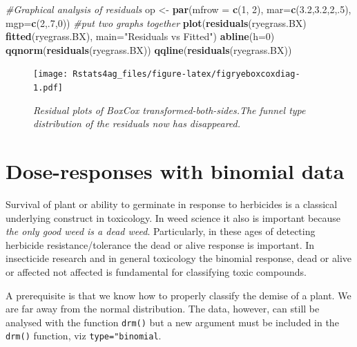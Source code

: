 \documentclass[letterpaper,]{book}
\newenvironment{Shaded}{\begin{snugshade}}{\end{snugshade}}
\newcommand{\CommentTok}[1]{\textcolor[rgb]{0.56,0.35,0.01}{\textit{#1}}}
\newcommand{\DataTypeTok}[1]{\textcolor[rgb]{0.13,0.29,0.53}{#1}}
\newcommand{\DecValTok}[1]{\textcolor[rgb]{0.00,0.00,0.81}{#1}}
\newcommand{\FloatTok}[1]{\textcolor[rgb]{0.00,0.00,0.81}{#1}}
\newcommand{\KeywordTok}[1]{\textcolor[rgb]{0.13,0.29,0.53}{\textbf{#1}}}
\newcommand{\NormalTok}[1]{#1}
\newcommand{\OperatorTok}[1]{\textcolor[rgb]{0.81,0.36,0.00}{\textbf{#1}}}
\newcommand{\StringTok}[1]{\textcolor[rgb]{0.31,0.60,0.02}{#1}}
\begin{document}
\begin{Shaded}
\begin{Highlighting}[]
\CommentTok{#Graphical analysis of residuals}
\NormalTok{op <-}\StringTok{ }\KeywordTok{par}\NormalTok{(}\DataTypeTok{mfrow =} \KeywordTok{c}\NormalTok{(}\DecValTok{1}\NormalTok{, }\DecValTok{2}\NormalTok{), }\DataTypeTok{mar=}\KeywordTok{c}\NormalTok{(}\FloatTok{3.2}\NormalTok{,}\FloatTok{3.2}\NormalTok{,}\DecValTok{2}\NormalTok{,.}\DecValTok{5}\NormalTok{), }\DataTypeTok{mgp=}\KeywordTok{c}\NormalTok{(}\DecValTok{2}\NormalTok{,.}\DecValTok{7}\NormalTok{,}\DecValTok{0}\NormalTok{)) }\CommentTok{#put two graphs together}
    \KeywordTok{plot}\NormalTok{(}\KeywordTok{residuals}\NormalTok{(ryegrass.BX) }\OperatorTok{~}\StringTok{ }\KeywordTok{fitted}\NormalTok{(ryegrass.BX), }\DataTypeTok{main=}\StringTok{"Residuals vs Fitted"}\NormalTok{)}
\KeywordTok{abline}\NormalTok{(}\DataTypeTok{h=}\DecValTok{0}\NormalTok{)}
\KeywordTok{qqnorm}\NormalTok{(}\KeywordTok{residuals}\NormalTok{(ryegrass.BX))}
 \KeywordTok{qqline}\NormalTok{(}\KeywordTok{residuals}\NormalTok{(ryegrass.BX))}
\end{Highlighting}
\end{Shaded}

\begin{figure}
\centering
\texttt{[image: Rstats4ag\_files/figure-latex/figryeboxcoxdiag-1.pdf]}
\caption{\label{fig:figryeboxcoxdiag}\emph{Residual plots of BoxCox transformed-both-sides.The funnel type distribution of the residuals now has disappeared.}}
\end{figure}

\hypertarget{dose-responses-with-binomial-data}{%
\section{Dose-responses with binomial data}\label{dose-responses-with-binomial-data}}

Survival of plant or ability to germinate in response to herbicides is a classical underlying construct in toxicology. In weed science it also is important because \emph{the only good weed is a dead weed}. Particularly, in these ages of detecting herbicide resistance/tolerance the dead or alive response is important. In insecticide research and in general toxicology the binomial response, dead or alive or affected not affected is fundamental for classifying toxic compounds.

A prerequisite is that we know how to properly classify the demise of a plant. We are far away from the normal distribution. The data, however, can still be analysed with the function \texttt{drm()} but a new argument must be included in the \texttt{drm()} function, viz \texttt{type="binomial}.
\end{document}
